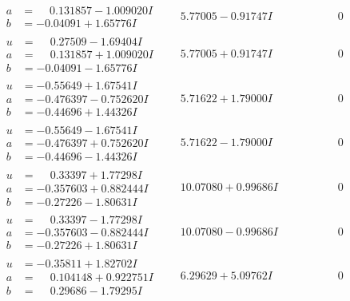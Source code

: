 \documentclass[1p]{elsarticle_modified}
\theoremstyle{definition}
\begin{document}
$$\begin{array}{c|c|c}
\begin{aligned}
a &= \phantom{-}0.131857 - 1.009020 I \\
b &= -0.04091 + 1.65776 I\end{aligned}
 & \phantom{-}5.77005 - 0.91747 I & \phantom{-0.000000 } 0 \\ \hline\begin{aligned}
u &= \phantom{-}0.27509 - 1.69404 I \\
a &= \phantom{-}0.131857 + 1.009020 I \\
b &= -0.04091 - 1.65776 I\end{aligned}
 & \phantom{-}5.77005 + 0.91747 I & \phantom{-0.000000 } 0 \\ \hline\begin{aligned}
u &= -0.55649 + 1.67541 I \\
a &= -0.476397 - 0.752620 I \\
b &= -0.44696 + 1.44326 I\end{aligned}
 & \phantom{-}5.71622 + 1.79000 I & \phantom{-0.000000 } 0 \\ \hline\begin{aligned}
u &= -0.55649 - 1.67541 I \\
a &= -0.476397 + 0.752620 I \\
b &= -0.44696 - 1.44326 I\end{aligned}
 & \phantom{-}5.71622 - 1.79000 I & \phantom{-0.000000 } 0 \\ \hline\begin{aligned}
u &= \phantom{-}0.33397 + 1.77298 I \\
a &= -0.357603 + 0.882444 I \\
b &= -0.27226 - 1.80631 I\end{aligned}
 & \phantom{-}10.07080 + 0.99686 I & \phantom{-0.000000 } 0 \\ \hline\begin{aligned}
u &= \phantom{-}0.33397 - 1.77298 I \\
a &= -0.357603 - 0.882444 I \\
b &= -0.27226 + 1.80631 I\end{aligned}
 & \phantom{-}10.07080 - 0.99686 I & \phantom{-0.000000 } 0 \\ \hline\begin{aligned}
u &= -0.35811 + 1.82702 I \\
a &= \phantom{-}0.104148 + 0.922751 I \\
b &= \phantom{-}0.29686 - 1.79295 I\end{aligned}
 & \phantom{-}6.29629 + 5.09762 I & \phantom{-0.000000 } 0 \\ \hline\begin{aligned}

\end{aligned}
\end{array}$$
\end{document}
